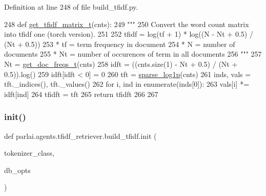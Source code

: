 Definition at line 248 of file build\+\_\+tfidf.\+py.


\begin{DoxyCode}
248 \textcolor{keyword}{def }\hyperlink{namespaceparlai_1_1agents_1_1tfidf__retriever_1_1build__tfidf_a3cd67edc9bfd76a8eeb49add2de75019}{get\_tfidf\_matrix\_t}(cnts):
249     \textcolor{stringliteral}{"""}
250 \textcolor{stringliteral}{    Convert the word count matrix into tfidf one (torch version).}
251 \textcolor{stringliteral}{}
252 \textcolor{stringliteral}{    tfidf = log(tf + 1) * log((N - Nt + 0.5) / (Nt + 0.5))}
253 \textcolor{stringliteral}{    * tf = term frequency in document}
254 \textcolor{stringliteral}{    * N = number of documents}
255 \textcolor{stringliteral}{    * Nt = number of occurences of term in all documents}
256 \textcolor{stringliteral}{    """}
257     Nt = \hyperlink{namespaceparlai_1_1agents_1_1tfidf__retriever_1_1build__tfidf_a284d006ecb031c337c64d7debe1407d3}{get\_doc\_freqs\_t}(cnts)
258     idft = ((cnts.size(1) - Nt + 0.5) / (Nt + 0.5)).log()
259     idft[idft < 0] = 0
260     tft = \hyperlink{namespaceparlai_1_1agents_1_1tfidf__retriever_1_1build__tfidf_a89650718966a5b0d1114e8b06b8c0dcc}{sparse\_log1p}(cnts)
261     inds, vals = tft.\_indices(), tft.\_values()
262     \textcolor{keywordflow}{for} i, ind \textcolor{keywordflow}{in} enumerate(inds[0]):
263         vals[i] *= idft[ind]
264     tfidft = tft
265     \textcolor{keywordflow}{return} tfidft
266 
267 
\end{DoxyCode}
\mbox{\label{namespaceparlai_1_1agents_1_1tfidf__retriever_1_1build__tfidf_a297d8a6b3ed43b31feccf5707517fee3}} 
\subsubsection{\texorpdfstring{init()}{init()}}
{\footnotesize\ttfamily def parlai.\+agents.\+tfidf\+\_\+retriever.\+build\+\_\+tfidf.\+init (\begin{DoxyParamCaption}\item[{}]{tokenizer\+\_\+class,  }\item[{}]{db\+\_\+opts }\end{DoxyParamCaption})}



